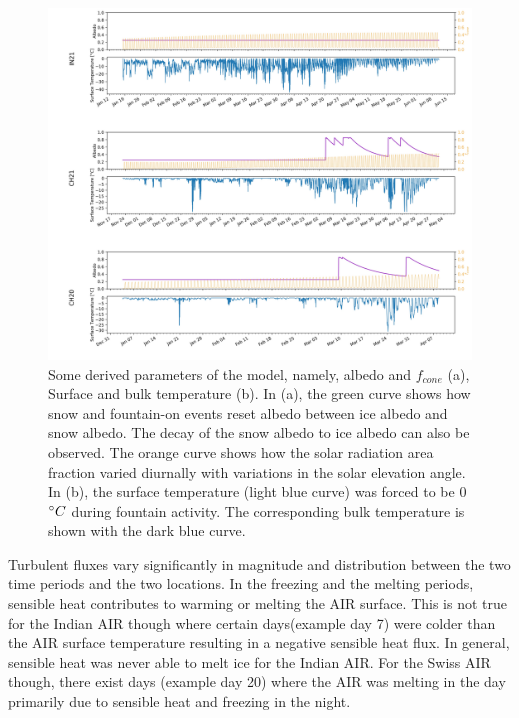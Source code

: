 \documentclass[utf8]{frontiersSCNS} %
\begin{document}
\begin{figure} 
    \begin{center} 
    \includegraphics[width=\linewidth]{Figures/albedo.jpg} 
    \end{center}
\caption{Some derived parameters of the model, namely, albedo and $f_{cone}$ (a), Surface and bulk temperature (b). In
    (a), the green curve shows how snow and fountain-on events reset albedo between ice albedo and snow albedo.  The
    decay of the snow albedo to ice albedo can also be observed. The orange curve shows how the solar radiation area
    fraction varied diurnally with variations in the solar elevation angle. In (b), the surface temperature (light blue
    curve) was forced to be 0 $\degree C$ during fountain activity. The corresponding bulk temperature is shown with the
    dark blue curve.} 
\label{fig:albedo} 
\end{figure}

Turbulent fluxes vary significantly in magnitude and distribution between the two time periods and the two locations.
In the freezing and the melting periods, sensible heat contributes to warming or melting the AIR surface. This is not
true for the Indian AIR though where certain days(example day 7) were colder than the AIR surface temperature resulting
in a negative sensible heat flux. In general, sensible heat was never able to melt ice for the Indian AIR. For the Swiss
AIR though, there exist days (example day 20) where the AIR was melting in the day primarily due to sensible heat and
freezing in the night. 
\end{document}
